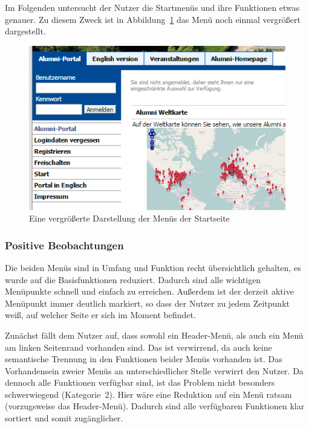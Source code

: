 %

Im Folgenden untersucht der Nutzer die Startmenüs und ihre Funktionen etwas genauer. Zu diesem Zweck ist in Abbildung~\ref{fig:menu} das Menü noch einmal vergrößert dargestellt.

\begin{figure}[h]
	\centering
		\includegraphics[width=\textwidth]{figures/menu.png}
	\caption{Eine vergrößerte Darstellung der Menüs der Startseite}
	\label{fig:menu}
\end{figure}


\subsubsection*{Positive Beobachtungen}
Die beiden Menüs sind in Umfang und Funktion recht übersichtlich gehalten, es wurde auf die Basisfunktionen reduziert. Dadurch sind alle wichtigen Menüpunkte schnell und einfach zu erreichen. 
Außerdem ist der derzeit aktive Menüpunkt immer deutlich markiert, so dass der Nutzer zu jedem Zeitpunkt weiß, auf welcher Seite er sich im Moment befindet.

{Zunächst fällt dem Nutzer auf, dass sowohl ein Header-Menü, als auch ein Menü am linken Seitenrand vorhanden sind. Das ist verwirrend, da auch keine semantische Trennung in den Funktionen beider Menüs vorhanden ist. 
}{Das Vorhandensein zweier Menüs an unterschiedlicher Stelle verwirrt den Nutzer. Da dennoch alle Funktionen verfügbar sind, ist das Problem nicht besonders schwerwiegend (Kategorie~2).
}{Hier wäre eine Reduktion auf ein Menü ratsam (vorzugsweise das Header-Menü). Dadurch sind alle verfügbaren Funktionen klar sortiert und somit zugänglicher. 
}\label{prob:start:menues}

